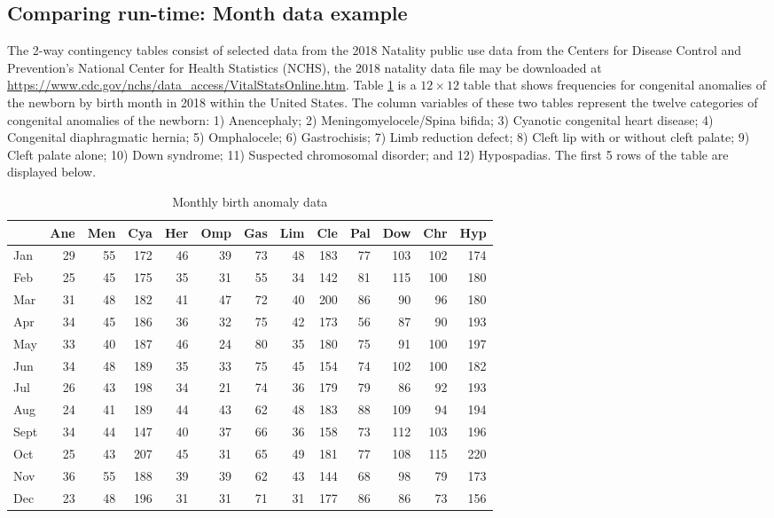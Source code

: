 \documentclass[article,nojss]{jss}\usepackage[]{graphicx}\usepackage[]{color}
\begin{document}
 
\subsection{Comparing run-time: Month data example}\label{fisher_month}
The 2-way contingency tables consist of selected data from the 2018 Natality public use data \citep{National2018} from the Centers for Disease Control and Prevention’s National Center for Health Statistics (NCHS), the 2018 natality data file may be downloaded at \url{https://www.cdc.gov/nchs/data_access/VitalStatsOnline.htm}. Table \ref{tab:month} is a $12 \times 12$ table that shows frequencies for congenital anomalies of the newborn by birth month in 2018 within the United States. The column variables of these two tables represent the twelve categories of congenital anomalies of the newborn: 1) Anencephaly; 2) Meningomyelocele/Spina bifida; 3) Cyanotic congenital heart disease; 4) Congenital diaphragmatic hernia; 5) Omphalocele; 6) Gastrochisis; 7) Limb reduction defect; 8) Cleft lip with or without cleft palate; 9) Cleft palate alone; 10) Down syndrome; 11) Suspected chromosomal disorder; and 12) Hypospadias. The first 5 rows of the table are displayed below.

 
\begin{table}

\caption{\label{tab:monthdata}Monthly birth anomaly data\label{tab:month}}
\centering
\begin{tabular}[t]{lrrrrrrrrrrrr}
\toprule
  & Ane & Men & Cya & Her & Omp & Gas & Lim & Cle & Pal & Dow & Chr & Hyp\\
\midrule
Jan & 29 & 55 & 172 & 46 & 39 & 73 & 48 & 183 & 77 & 103 & 102 & 174\\
Feb & 25 & 45 & 175 & 35 & 31 & 55 & 34 & 142 & 81 & 115 & 100 & 180\\
Mar & 31 & 48 & 182 & 41 & 47 & 72 & 40 & 200 & 86 & 90 & 96 & 180\\
Apr & 34 & 45 & 186 & 36 & 32 & 75 & 42 & 173 & 56 & 87 & 90 & 193\\
May & 33 & 40 & 187 & 46 & 24 & 80 & 35 & 180 & 75 & 91 & 100 & 197\\
Jun & 34 & 48 & 189 & 35 & 33 & 75 & 45 & 154 & 74 & 102 & 100 & 182\\
Jul & 26 & 43 & 198 & 34 & 21 & 74 & 36 & 179 & 79 & 86 & 92 & 193\\
Aug & 24 & 41 & 189 & 44 & 43 & 62 & 48 & 183 & 88 & 109 & 94 & 194\\
Sept & 34 & 44 & 147 & 40 & 37 & 66 & 36 & 158 & 73 & 112 & 103 & 196\\
Oct & 25 & 43 & 207 & 45 & 31 & 65 & 49 & 181 & 77 & 108 & 115 & 220\\
Nov & 36 & 55 & 188 & 39 & 39 & 62 & 43 & 144 & 68 & 98 & 79 & 173\\
Dec & 23 & 48 & 196 & 31 & 31 & 71 & 31 & 177 & 86 & 86 & 73 & 156\\
\bottomrule
\end{tabular}
\end{table}
\end{document}
